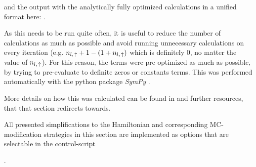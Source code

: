 and the output with the analytically fully optimized calculations in a unified format here:
.

As this needs to be run quite often, it is useful to reduce the number of calculations as much as possible and avoid running unnecessary calculations on every iteration (e.g. $n_{l,\,\uparrow} + 1 - (1 + n_{l,\,\uparrow})$ which is definitely 0, no matter the value of $n_{l,\,\uparrow}$).
For this reason, the terms were pre-optimized as much as possible, by trying to pre-evaluate to definite zeros or constants terms. 
This was performed automatically with the python package \emph{SymPy} \cite{sympyPackage}.

More details on how this was calculated can be found in  and further resources, that that section redirects towards.

\vspace{1cm}
All presented simplifications to the Hamiltonian and corresponding MC-modification strategies in this section are implemented as options that are selectable in the control-script   

.